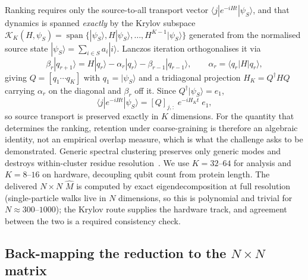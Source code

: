 \documentclass[10pt,a4paper]{article}
\newcommand{\Mhat}{\hat{M}}
\begin{document}
Ranking requires only the source-to-all transport vector $\langle j|e^{-iHt}|\psi_S\rangle$, and
that dynamics is spanned \emph{exactly} by the Krylov subspace $\mathcal{K}_K(H,\psi_S) =
\operatorname{span}\{|\psi_S\rangle, H|\psi_S\rangle, \dots, H^{K-1}|\psi_S\rangle\}$ generated from
the normalised source state $|\psi_S\rangle = \sum_{i \in S} a_i |i\rangle$. Lanczos iteration
orthogonalises it via
\begin{equation}
\beta_r |q_{r+1}\rangle = H|q_r\rangle - \alpha_r |q_r\rangle - \beta_{r-1}|q_{r-1}\rangle,
\qquad \alpha_r = \langle q_r | H | q_r \rangle,
\end{equation}
giving $Q = [q_1 \cdots q_K]$ with $q_1 = |\psi_S\rangle$ and a tridiagonal projection
$H_K = Q^{\dagger} H Q$ carrying $\alpha_r$ on the diagonal and $\beta_r$ off it. Since
$Q^{\dagger}|\psi_S\rangle = e_1$,
\begin{equation}
\langle j|e^{-iHt}|\psi_S\rangle = [Q]_{j,:}\; e^{-iH_K t}\; e_1 ,
\end{equation}
so source transport is preserved exactly in $K$ dimensions. For the quantity that determines the
ranking, retention under coarse-graining is therefore an algebraic identity, not an empirical overlap
measure, which is what the challenge asks to be demonstrated. Generic spectral clustering
preserves only generic modes and destroys within-cluster residue resolution~\cite{novo2015}. We use $K = 32$--$64$ for analysis and
$K = 8$--$16$ on hardware, decoupling qubit count from protein length. The delivered $N \times N$
$\Mhat$ is computed by exact eigendecomposition at full resolution (single-particle walks live in $N$
dimensions, so this is polynomial and trivial for $N \approx 300$--$1000$); the Krylov route supplies
the hardware track, and agreement between the two is a required consistency check.

\subsection{Back-mapping the reduction to the $N\times N$ matrix}
\end{document}
